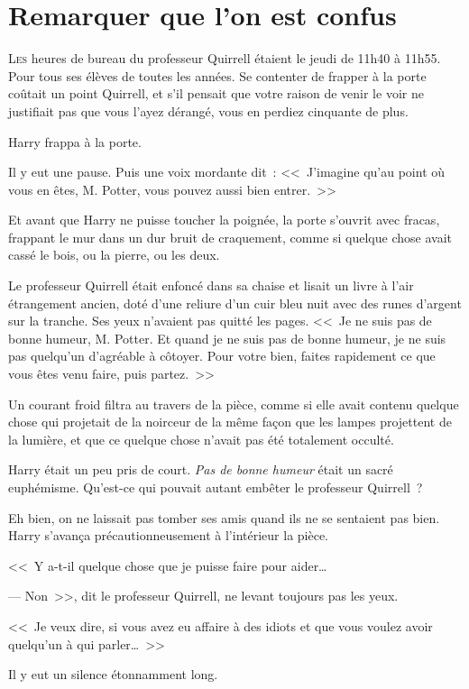 \chapter{Remarquer que l'on est confus}

\lettrine{L}{es} heures de bureau du professeur Quirrell étaient le jeudi de 11h40 à 11h55. Pour tous ses élèves de toutes les années. Se contenter de frapper à la porte coûtait un point Quirrell, et s'il pensait que votre raison de venir le voir ne justifiait pas que vous l'ayez dérangé, vous en perdiez cinquante de plus.

Harry frappa à la porte.

Il y eut une pause. Puis une voix mordante dit~: <<~J'imagine qu'au point où vous en êtes, M. Potter, vous pouvez aussi bien entrer.~>>

Et avant que Harry ne puisse toucher la poignée, la porte s'ouvrit avec fracas, frappant le mur dans un dur bruit de craquement, comme si quelque chose avait cassé le bois, ou la pierre, ou les deux.

Le professeur Quirrell était enfoncé dans sa chaise et lisait un livre à l'air étrangement ancien, doté d'une reliure d'un cuir bleu nuit avec des runes d'argent sur la tranche. Ses yeux n'avaient pas quitté les pages. <<~Je ne suis pas de bonne humeur, M. Potter. Et quand je ne suis pas de bonne humeur, je ne suis pas quelqu'un d'agréable à côtoyer. Pour votre bien, faites rapidement ce que vous êtes venu faire, puis partez.~>>

Un courant froid filtra au travers de la pièce, comme si elle avait contenu quelque chose qui projetait de la noirceur de la même façon que les lampes projettent de la lumière, et que ce quelque chose n'avait pas été totalement occulté.

Harry était un peu pris de court. \emph{Pas de bonne humeur} était un sacré euphémisme. Qu'est-ce qui pouvait autant embêter le professeur Quirrell~?

Eh bien, on ne laissait pas tomber ses amis quand ils ne se sentaient pas bien. Harry s'avança précautionneusement à l'intérieur la pièce.

<<~Y a-t-il quelque chose que je puisse faire pour aider…

--- Non~>>, dit le professeur Quirrell, ne levant toujours pas les yeux.

<<~Je veux dire, si vous avez eu affaire à des idiots et que vous voulez avoir quelqu'un à qui parler…~>>

Il y eut un silence étonnamment long.

